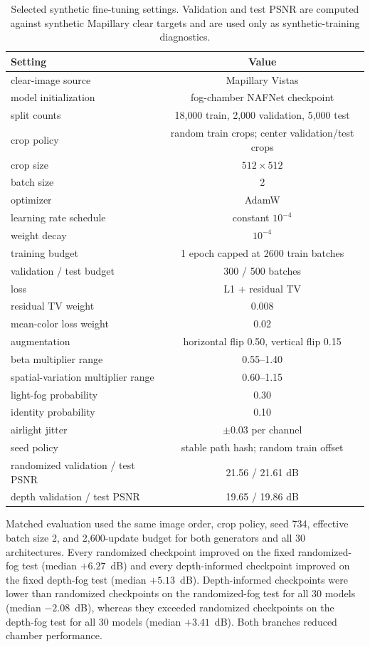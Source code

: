 \documentclass[9pt]{osa-supplemental-document}
\begin{document}
\begin{table}[htbp]
\centering
\small
\caption{Selected synthetic fine-tuning settings. Validation and test PSNR are computed against synthetic Mapillary clear targets and are used only as synthetic-training diagnostics.}
\label{tabS:spatial_synth_training}
\begin{tabular}{lc}
\toprule
\textbf{Setting} & \textbf{Value} \\
\midrule
clear-image source & Mapillary Vistas \\
model initialization & fog-chamber NAFNet checkpoint \\
split counts & 18{,}000 train, 2{,}000 validation, 5{,}000 test \\
crop policy & random train crops; center validation/test crops \\
crop size & $512 \times 512$ \\
batch size & 2 \\
optimizer & AdamW \\
learning rate schedule & constant $10^{-4}$ \\
weight decay & $10^{-4}$ \\
training budget & 1 epoch capped at 2600 train batches \\
validation / test budget & 300 / 500 batches \\
loss & L1 + residual TV \\
residual TV weight & 0.008 \\
mean-color loss weight & 0.02 \\
augmentation & horizontal flip 0.50, vertical flip 0.15 \\
beta multiplier range & 0.55--1.40 \\
spatial-variation multiplier range & 0.60--1.15 \\
light-fog probability & 0.30 \\
identity probability & 0.10 \\
airlight jitter & $\pm 0.03$ per channel \\
seed policy & stable path hash; random train offset \\
randomized validation / test PSNR & 21.56 / 21.61 dB \\
depth validation / test PSNR & 19.65 / 19.86 dB \\
\bottomrule
\end{tabular}
\end{table}

Matched evaluation used the same image order, crop policy, seed 734,
effective batch size 2, and 2{,}600-update budget for both generators
and all 30 architectures. Every randomized checkpoint improved on the
fixed randomized-fog test (median $+6.27$~dB) and every depth-informed
checkpoint improved on the fixed depth-fog test (median $+5.13$~dB).
Depth-informed checkpoints were lower than randomized checkpoints on the
randomized-fog test for all 30 models (median $-2.08$~dB), whereas they
exceeded randomized checkpoints on the depth-fog test for all 30
models (median $+3.41$~dB). Both branches reduced chamber performance.
\end{document}
